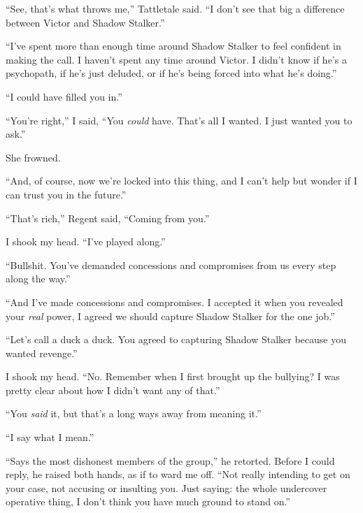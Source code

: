 ``See, that's what throws me,'' Tattletale said.  ``I don't see that big a difference between Victor and Shadow Stalker.''



``I've spent more than enough time around Shadow Stalker to feel confident in making the call.  I haven't spent any time around Victor.  I didn't know if he's a psychopath, if he's just deluded, or if he's being forced into what he's doing.''



``I could have filled you in.''



``You're right,'' I said, ``You \emph{could} have.  That's all I wanted.  I just wanted you to ask.''



She frowned.



``And, of course, now we're locked into this thing, and I can't help but wonder if I can trust you in the future.''



``That's rich,'' Regent said, ``Coming from you.''



I shook my head.  ``I've played along.''



``Bullshit.  You've demanded concessions and compromises from us every step along the way.''



``And I've made concessions and compromises.  I accepted it when you revealed your \emph{real} power, I agreed we should capture Shadow Stalker for the one job.''



``Let's call a duck a duck.  You agreed to capturing Shadow Stalker because you wanted revenge.''



I shook my head.  ``No.  Remember when I first brought up the bullying?  I was pretty clear about how I didn't want any of that.''



``You \emph{said} it, but that's a long ways away from meaning it.''



``I say what I mean.''



``Says the most dishonest members of the group,'' he retorted.  Before I could reply, he raised both hands, as if to ward me off.  ``Not really intending to get on your case, not accusing or insulting you.  Just saying: the whole undercover operative thing, I don't think you have much ground to stand on.''



